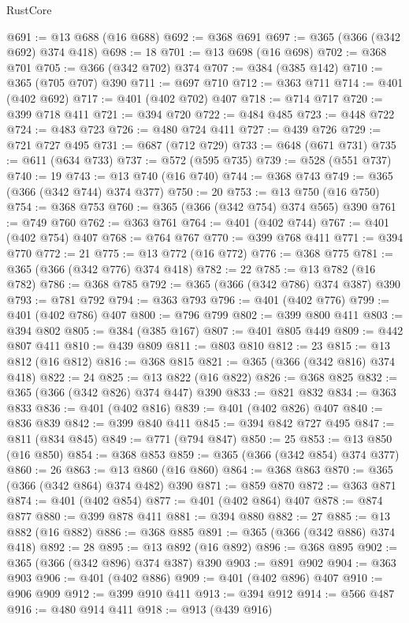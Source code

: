 \begin{lexlean}{RustCore}
\begin{coremodule}
@691 := @13 @688 (@16 @688)
@692 := @368 @691
@697 := @365 (@366 (@342 @692) @374 @418)
@698 := 18
@701 := @13 @698 (@16 @698)
@702 := @368 @701
@705 := @366 (@342 @702) @374
@707 := @384 (@385 @142)
@710 := @365 (@705 @707) @390
@711 := @697 @710
@712 := @363 @711
@714 := @401 (@402 @692)
@717 := @401 (@402 @702) @407
@718 := @714 @717
@720 := @399 @718 @411
@721 := @394 @720
@722 := @484 @485
@723 := @448 @722
@724 := @483 @723
@726 := @480 @724 @411
@727 := @439 @726
@729 := @721 @727 @495
@731 := @687 (@712 @729)
@733 := @648 (@671 @731)
@735 := @611 (@634 @733)
@737 := @572 (@595 @735)
@739 := @528 (@551 @737)
@740 := 19
@743 := @13 @740 (@16 @740)
@744 := @368 @743
@749 := @365 (@366 (@342 @744) @374 @377)
@750 := 20
@753 := @13 @750 (@16 @750)
@754 := @368 @753
@760 := @365 (@366 (@342 @754) @374 @565) @390
@761 := @749 @760
@762 := @363 @761
@764 := @401 (@402 @744)
@767 := @401 (@402 @754) @407
@768 := @764 @767
@770 := @399 @768 @411
@771 := @394 @770
@772 := 21
@775 := @13 @772 (@16 @772)
@776 := @368 @775
@781 := @365 (@366 (@342 @776) @374 @418)
@782 := 22
@785 := @13 @782 (@16 @782)
@786 := @368 @785
@792 := @365 (@366 (@342 @786) @374 @387) @390
@793 := @781 @792
@794 := @363 @793
@796 := @401 (@402 @776)
@799 := @401 (@402 @786) @407
@800 := @796 @799
@802 := @399 @800 @411
@803 := @394 @802
@805 := @384 (@385 @167)
@807 := @401 @805 @449
@809 := @442 @807 @411
@810 := @439 @809
@811 := @803 @810
@812 := 23
@815 := @13 @812 (@16 @812)
@816 := @368 @815
@821 := @365 (@366 (@342 @816) @374 @418)
@822 := 24
@825 := @13 @822 (@16 @822)
@826 := @368 @825
@832 := @365 (@366 (@342 @826) @374 @447) @390
@833 := @821 @832
@834 := @363 @833
@836 := @401 (@402 @816)
@839 := @401 (@402 @826) @407
@840 := @836 @839
@842 := @399 @840 @411
@845 := @394 @842 @727 @495
@847 := @811 (@834 @845)
@849 := @771 (@794 @847)
@850 := 25
@853 := @13 @850 (@16 @850)
@854 := @368 @853
@859 := @365 (@366 (@342 @854) @374 @377)
@860 := 26
@863 := @13 @860 (@16 @860)
@864 := @368 @863
@870 := @365 (@366 (@342 @864) @374 @482) @390
@871 := @859 @870
@872 := @363 @871
@874 := @401 (@402 @854)
@877 := @401 (@402 @864) @407
@878 := @874 @877
@880 := @399 @878 @411
@881 := @394 @880
@882 := 27
@885 := @13 @882 (@16 @882)
@886 := @368 @885
@891 := @365 (@366 (@342 @886) @374 @418)
@892 := 28
@895 := @13 @892 (@16 @892)
@896 := @368 @895
@902 := @365 (@366 (@342 @896) @374 @387) @390
@903 := @891 @902
@904 := @363 @903
@906 := @401 (@402 @886)
@909 := @401 (@402 @896) @407
@910 := @906 @909
@912 := @399 @910 @411
@913 := @394 @912
@914 := @566 @487
@916 := @480 @914 @411
@918 := @913 (@439 @916)

\end{coremodule}
\end{lexlean}
